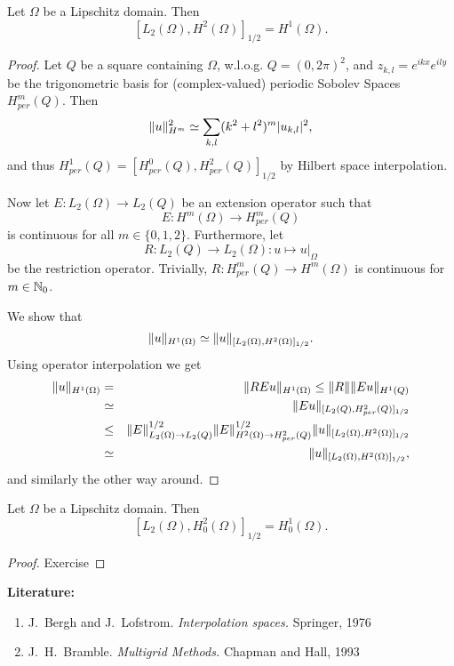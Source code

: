 \begin{theorem} Let $\Omega$ be a Lipschitz domain. Then
$$ 
[L_2(\Omega), H^2(\Omega)]_{1/2} = H^1(\Omega).
$$
\end{theorem}
\begin{proof} Let $Q$ be a square containing $\Omega$, w.l.o.g. $Q = (0,2\pi)^2$, and $z_{k,l} = e^{ikx} e^{ily}$ be the trigonometric basis for (complex-valued) periodic Sobolev Spaces $H^m_{per}(Q)$. Then
$$
\| u \|_{H^m}^2 \simeq \sum_{k,l} (k^2+l^2)^m | u_{k,l} |^2,
$$
and thus $H^1_{per}(Q) = [H^0_{per}(Q), H^2_{per}(Q)]_{1/2}$ by Hilbert space interpolation.

Now let $E: L_2(\Omega) \rightarrow L_2(Q)$ be an extension operator such that
$$
E : H^m(\Omega) \rightarrow H^m_{per}(Q) 
$$ 
is continuous for all $m \in \{0,1,2\}$. Furthermore, let 
$$
R : L_2(Q) \rightarrow L_2(\Omega)  : u \mapsto u|_\Omega
$$
be the restriction operator. Trivially, $R : H_{per}^m (Q) \rightarrow H^m(\Omega)$ is continuous for $m \in {\mathbb N}_0$.
 
We show that
$$
\| u \|_{H^1(\Omega)} \simeq \| u \|_{[L_2(\Omega), H^2(\Omega)]_{1/2}}.
$$
Using operator interpolation we get
\begin{eqnarray*}
\| u \|_{H^1(\Omega)} & = &\| R E u \|_{H^1(\Omega)} \leq \| R \| \| E u \|_{H^1(Q)} \\
& \simeq & \| E u \|_{[L_2(Q),H^2_{per}(Q)]_{1/2}} \\
& \leq & \| E \|_{L_2(\Omega)\rightarrow L_2(Q)}^{1/2} \| E \|_{H^2(\Omega)\rightarrow H^2_{per}(Q)}^{1/2}  \| u \|_{[L_2(\Omega), H^2(\Omega)]_{1/2}} \\
& \simeq &  \| u \|_{[L_2(\Omega), H^2(\Omega)]_{1/2}},
\end{eqnarray*}
and similarly the other way around.
\end{proof}
 

\begin{theorem} Let $\Omega$ be a Lipschitz domain. Then
$$ 
[L_2(\Omega), H_0^2(\Omega)]_{1/2} = H_0^1(\Omega).
$$
\end{theorem}
\begin{proof} Exercise
\end{proof}





\bigskip \noindent 
{\bf Literature:}
\begin{enumerate}
\item 
 J.~Bergh and J.~Lofstrom.  {\em Interpolation spaces.}  Springer,
1976 
\item
J.~H.~Bramble. 
 {\em Multigrid Methods.} 
 Chapman and Hall, 1993
 \end{enumerate}



% 

